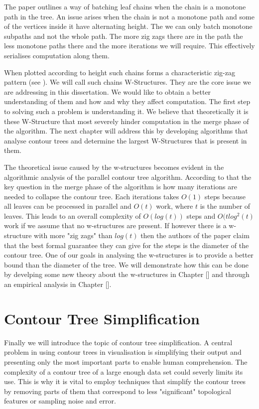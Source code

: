 The paper \cite{parallel-peak-pruning} outlines a way of batching leaf chains when the chain is a monotone path in the tree. An issue arises when the chain is not a monotone path and some of the vertices inside it have alternating height. The we can only batch monotone subpaths and not the whole path. The more zig zags there are in the path the less monotone paths there and the more iterations we will require. This effectively serialises computation along them.

When plotted according to height such chains forms a characteristic zig-zag pattern (see \cite{parallel-peak-pruning}). We will call such chains W-Structures. They are the core issue we are addressing in this dissertation. We would like to obtain a better understanding of them and how and why they affect computation. The first step to solving such a problem is understanding it. We believe that theoretically it is these W-Structure that most severely hinder computation in the merge phase of the algorithm. The next chapter will address this by developing algorithms that analyse contour trees and determine the largest W-Structures that is present in them.

The theoretical issue caused by the w-structures becomes evident in the algorithmic analysis of the parallel contour tree algorithm. According to that the key question in the merge phase of the algorithm is how many iterations are needed to collapse the contour tree. Each iterations takes $O(1)$ steps because all leaves can be processed in parallel and $O(t)$ work, where $t$ is the number of leaves. This leads to an overall complexity of $O(log(t))$ steps and $O(tlog^2(t)$ work if we assume that no w-structures are present. If however there is a w-structure with more "zig zags" than $log(t)$ then the authors of the paper claim that the best formal guarantee they can give for the steps is the diameter of the contour tree. One of our goals in analysing the w-structures is to provide a better bound than the diameter of the tree. We will demonstrate how this can be done by develping some new theory about the w-structures in Chapter [] and through an empirical analysis in Chapter [].


\section{Contour Tree Simplification}

Finally we will introduce the topic of contour tree simplification. A central problem in using contour trees in visualisation is simplifying their output and presenting only the most important parts to enable human comprehension. The complexity of a contour tree of a large enough data set could severly limits its use. This is why it is vital to employ techniques that simplify the contour trees by removing parts of them that correspond to less "significant" topological features or sampling noise and error.

